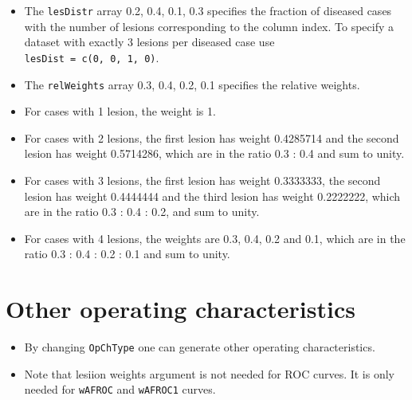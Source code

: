 \documentclass[
]{book}
\newenvironment{Shaded}{\begin{snugshade}}{\end{snugshade}}
\newcommand{\AttributeTok}[1]{\textcolor[rgb]{0.77,0.63,0.00}{#1}}
\newcommand{\DecValTok}[1]{\textcolor[rgb]{0.00,0.00,0.81}{#1}}
\newcommand{\FloatTok}[1]{\textcolor[rgb]{0.00,0.00,0.81}{#1}}
\newcommand{\FunctionTok}[1]{\textcolor[rgb]{0.00,0.00,0.00}{#1}}
\newcommand{\NormalTok}[1]{#1}
\newcommand{\OtherTok}[1]{\textcolor[rgb]{0.56,0.35,0.01}{#1}}
\newcommand{\SpecialCharTok}[1]{\textcolor[rgb]{0.00,0.00,0.00}{#1}}
\newcommand{\StringTok}[1]{\textcolor[rgb]{0.31,0.60,0.02}{#1}}
\providecommand{\tightlist}{%
  \setlength{\itemsep}{0pt}\setlength{\parskip}{0pt}}
\begin{document}
\begin{itemize}
\tightlist
\item
  The \texttt{lesDistr} array 0.2, 0.4, 0.1, 0.3 specifies the fraction of diseased cases with the number of lesions corresponding to the column index. To specify a dataset with exactly 3 lesions per diseased case use \texttt{lesDist\ =\ c(0,\ 0,\ 1,\ 0)}.
\item
  The \texttt{relWeights} array 0.3, 0.4, 0.2, 0.1 specifies the relative weights.
\item
  For cases with 1 lesion, the weight is 1.
\item
  For cases with 2 lesions, the first lesion has weight 0.4285714 and the second lesion has weight 0.5714286, which are in the ratio 0.3 : 0.4 and sum to unity.
\item
  For cases with 3 lesions, the first lesion has weight 0.3333333, the second lesion has weight 0.4444444 and the third lesion has weight 0.2222222, which are in the ratio 0.3 : 0.4 : 0.2, and sum to unity.
\item
  For cases with 4 lesions, the weights are 0.3, 0.4, 0.2 and 0.1, which are in the ratio 0.3 : 0.4 : 0.2 : 0.1 and sum to unity.
\end{itemize}

\hypertarget{other-operating-characteristics}{%
\section{Other operating characteristics}\label{other-operating-characteristics}}

\begin{itemize}
\tightlist
\item
  By changing \texttt{OpChType} one can generate other operating characteristics.
\item
  Note that lesiion weights argument is not needed for ROC curves. It is only needed for \texttt{wAFROC} and \texttt{wAFROC1} curves.
\end{itemize}

\begin{Shaded}
\end{Shaded}
\end{document}

